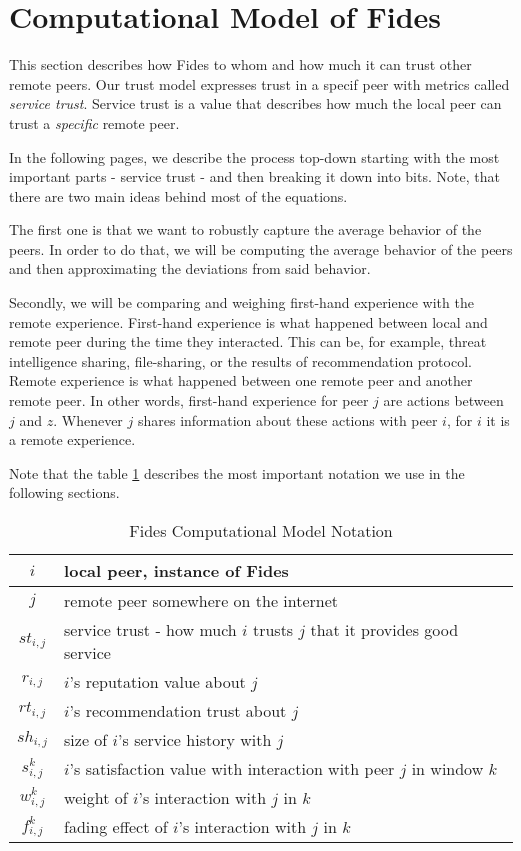 \section{Computational Model of Fides}
\label{sec:computational-model}
This section describes how Fides to whom and how much it can trust other remote peers.
Our trust model expresses trust in a specif peer with metrics called \textit{service trust}.
Service trust is a value that describes how much the local peer can trust a \textit{specific} remote peer. 

In the following pages, we describe the process top-down starting with the most important parts - service trust - and then breaking it down into bits.
Note, that there are two main ideas behind most of the equations. 

The first one is that we want to robustly capture the average behavior of the peers. In order to do that, we will be computing the average behavior of the peers and then approximating the deviations from said behavior.

Secondly, we will be comparing and weighing first-hand experience with the remote experience. 
First-hand experience is what happened between local and remote peer during the time they interacted. This can be, for example, threat intelligence sharing, file-sharing, or the results of recommendation protocol.
Remote experience is what happened between one remote peer and another remote peer. In other words, first-hand experience for peer $j$ are actions between $j$ and $z$. Whenever $j$ shares information about these actions with peer $i$, for $i$ it is a remote experience.

\vspace{0.5cm}

\noindent
Note that the table \ref{tab:notation-computational-model} describes the most important notation we use in the following sections.

\begin{table}[ht]
\centering
\begin{tabular}{ c | m{20em} }
 $i$ & local peer, instance of Fides \\
 \hline
 $j$ & remote peer somewhere on the internet \\
 \hline
 $st_{i, j}$ & service trust - how much $i$ trusts $j$ that it provides good service \\
 \hline
 $r_{i, j}$ & $i$'s reputation value about $j$ \\
 \hline
 $rt_{i, j}$ & $i$'s recommendation trust about $j$ \\
 \hline
 $sh_{i, j}$ & size of $i$'s service history with $j$ \\
 \hline
 $s^{k}_{i, j}$ & $i$'s satisfaction value with interaction with peer $j$ in window $k$\\
 \hline
 $w^{k}_{i, j}$ & weight of $i$'s interaction with $j$ in $k$ \\
 \hline
 $f^{k}_{i, j}$ & fading effect of $i$'s interaction with $j$ in $k$ \\
\end{tabular}
\caption{Fides Computational Model Notation}
\label{tab:notation-computational-model}
\end{table}

